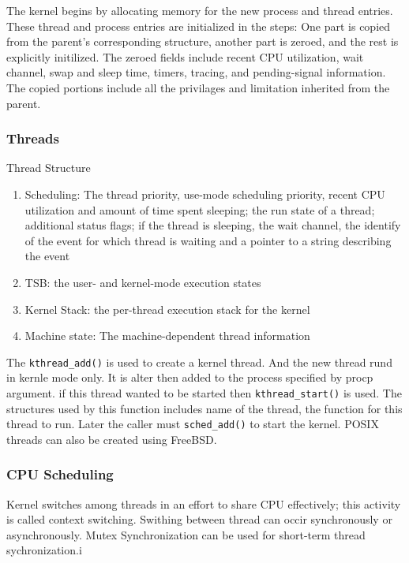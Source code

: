 \documentclass[letterpaper,10pt,draftclsnofoot,onecolumn]{IEEEtran}
\begin{document}
The kernel begins by allocating memory for the new process and thread entries. These thread and process entries are initialized in the steps: One part is copied from the parent's corresponding structure, another part is zeroed, and the rest is explicitly initilized. The zeroed fields include recent CPU utilization, wait channel, swap and sleep time, timers, tracing, and pending-signal information. The copied portions include all the privilages and limitation inherited from the parent.

\subsubsection*{Threads}

Thread Structure
\begin{enumerate}
\item Scheduling: The thread priority, use-mode scheduling priority, recent CPU utilization and amount of time spent sleeping; the run state of a thread; additional status flags; if the thread is sleeping, the wait channel, the identify of the event for which thread is waiting and a pointer to a string describing the event
\item TSB: the user- and kernel-mode execution states
\item Kernel Stack: the per-thread execution stack for the kernel
\item Machine state: The machine-dependent thread information\cite{[2]} \\
\end{enumerate}

The \verb|kthread_add()| is used to create a kernel thread. And the new thread rund in kernle mode only. It is alter then added to the process specified by procp argument. if this thread wanted to be started then \verb|kthread_start()| is used. The structures used by this function includes name of the thread, the function for this thread to run. Later the caller must \verb|sched_add()| to start the kernel. POSIX threads can also be created using FreeBSD.

\subsubsection*{CPU Scheduling}

Kernel switches among threads in an effort to share CPU effectively; this activity is called context switching. Swithing between thread can occir synchronously or asynchronously. Mutex Synchronization can be used for short-term thread sychronization.i
\end{document}
